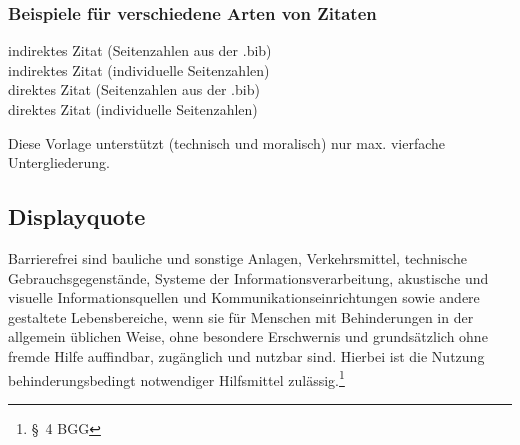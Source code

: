 \newpage
\subsubsection{Beispiele für verschiedene Arten von Zitaten}%

indirektes Zitat (Seitenzahlen aus der .bib)\\%
indirektes Zitat (individuelle Seitenzahlen)\\%
direktes Zitat (Seitenzahlen aus der .bib)\\%
direktes Zitat (individuelle Seitenzahlen)

Diese Vorlage unterstützt (technisch und moralisch) nur max. vierfache Untergliederung.

\subsection{Displayquote}
\begin{displayquote}
    Barrierefrei sind bauliche und sonstige Anlagen, Verkehrsmittel, technische Gebrauchsgegenstände, Systeme der Informationsverarbeitung, akustische und visuelle Informationsquellen und Kommunikationseinrichtungen sowie andere gestaltete Lebensbereiche, wenn sie für Menschen mit Behinderungen in der allgemein üblichen Weise, ohne besondere Erschwernis und grundsätzlich ohne fremde Hilfe auffindbar, zugänglich und nutzbar sind. Hierbei ist die Nutzung behinderungsbedingt notwendiger Hilfsmittel zulässig.\footnote{§ 4 BGG}
\end{displayquote}

\iffalse
